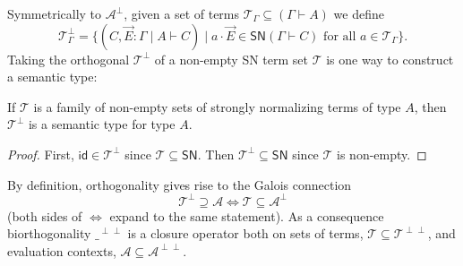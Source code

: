 \documentclass[a4paper,USenglish,cleveref, autoref, thm-restate]{lipics-v2019}
\newcommand{\tid}{\mathsf{id}}
\newcommand{\A}{\mathcal{A}}
\newcommand{\T}{\mathcal{T}}
\newcommand{\SN}{\mathsf{SN}}
\begin{document}
\noindent
Symmetrically to $\A^\perp$, given a set of terms $\T_\Gamma \subseteq
(\Gamma \vdash A)$ we define
\[
  \T_\Gamma^\perp =
  \{ (C, \vec E : \Gamma \mid A \vdash C) \mid
  a \cdot \vec E \in \SN(\Gamma \vdash C)
  \mbox{ for all } a \in \T_\Gamma \}
  .
\]
Taking the orthogonal $\T^\perp$ of a non-empty SN term set $\T$ is one way to
construct a semantic type:
\begin{lemma}
  \label{lem:orthsem}
  If $\T$ is a family of non-empty sets of strongly normalizing terms
  of type $A$, then
  $\T^\perp$ is a semantic type for type $A$.
\end{lemma}
\begin{proof}
  First, $\tid \in \T^\perp$ since $\T \subseteq \SN$.
  Then $\T^\perp \subseteq \SN$ since $\T$ is non-empty.
\end{proof}
%
By definition, orthogonality gives rise to the Galois
connection
\[
  \T^\perp \supseteq \A \iff \T \subseteq \A^\perp
\]
(both sides of $\iff$ expand to the same statement).  As a consequence
biorthogonality $\_^{\perp\perp}$ is a closure operator both on sets
of terms, $\T \subseteq \T^{\perp\perp}$, and evaluation contexts,
$\A \subseteq \A^{\perp\perp}$.
\end{document}
